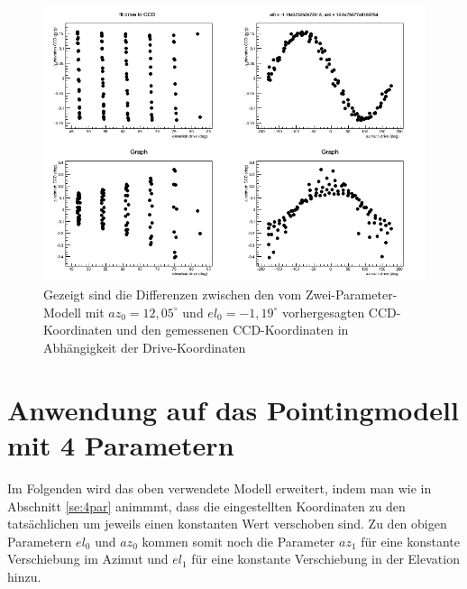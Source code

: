 \begin{figure}[htbp]
\centering

\includegraphics[width=\textwidth]{../341/run341D2C.png}
\caption{Gezeigt sind die Differenzen zwischen den vom Zwei-Parameter-Modell mit $az_0=12,05^{\circ}$ und $el_0=-1,19^{\circ}$ vorhergesagten CCD-Koordinaten und den gemessenen CCD-Koordinaten in Abhängigkeit der Drive-Koordinaten}
\label{img:D2C}
\end{figure}

\section{Anwendung auf das Pointingmodell mit 4 Parametern}
Im Folgenden wird das oben verwendete Modell erweitert, indem man wie in Abschnitt \ref{se:4par} animmmt, dass die eingestellten Koordinaten zu den tatsächlichen um jeweils einen konstanten Wert verschoben sind. Zu den obigen Parametern $el_0$ und $az_0$ kommen somit noch die Parameter $az_1$ für eine konstante Verschiebung im Azimut und $el_1$ für eine konstante Verschiebung in der Elevation hinzu.
